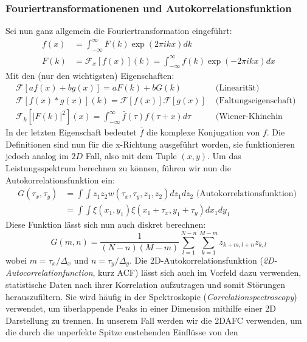 \subsubsection{Fouriertransformationenen und Autokorrelationsfunktion}
Sei nun ganz allgemein die Fouriertransformation eingeführt:
\begin{align}
f(x) &= \int_{-\infty}^{\infty} F(k)\exp(2\pi i kx)dk\\
F(k) &= \mathcal{F}_x\left [f(x)\right ](k) =
\int_{-\infty}^{\infty} f(k)\exp(-2\pi i kx)dx
\end{align}
Mit den (nur den wichtigsten) Eigenschaften:
\begin{align}
&\mathcal{F}\left [a f(x) + b g(x)\right ]
    = a F(k) + b G(k) 
    &\mbox{ (Linearität) }\\
&\mathcal{F}\left [f(x) * g(x)\right ](k)
    = \mathcal{F}\left [f(x)\right ]\mathcal{F}\left [g(x)\right ]
    \! &\mbox{ (Faltungseigenschaft) }\\
&\mathcal{F}_k\left [\left | F(k) \right |^2\right ](x)
   =  \int_{-\infty}^{\infty}\bar{f}(\tau)f(\tau + x) d\tau 
   &\mbox{ (Wiener-Khinchin Theorem) }
\end{align}
In der letzten Eigenschaft
bedeutet $\bar{f}$ die komplexe Konjugation von $f$.
Die Definitionen sind nun für die x-Richtung ausgeführt worden,
sie funktionieren jedoch analog im $2D$ Fall, also mit dem Tuple
$(x,y)$. 
Um das Leistungsspektrum berechnen zu können, führen wir 
nun die Autokorrelationsfunktion ein:
\begin{align}
    G(\tau_x,\tau_y) &=\int\int z_1 z_2 w(\tau_x,\tau_y,z_1,z_2) dz_1 dz_2 \mbox{ (Autokorrelationsfunktion) }\\
&= \int\int \xi(x_1,y_1)\xi(x_1+\tau_x,y_1+\tau_y)dx_1dy_1
\end{align}
Diese Funktion lässt sich nun auch diskret berechnen:
\begin{equation}
    G(m,n)=\frac{1}{(N-n)(M-m)}\sum_{l=1}^{N-n}\sum_{k=1}^{M-m}z_{k+m,l+n}z_{k,l}
\end{equation}
wobei $m=\tau_x/\Delta_x$ und $n=\tau_y/\Delta_y$. Die 2D-Autokorrelationsfunktion
(\textit{2D-Autocorrelationfunction}, kurz ACF) lässt sich auch im Vorfeld dazu verwenden,
statistische Daten nach ihrer Korrelation aufzutragen und somit Störungen herauszufiltern.
Sie wird häufig in der Spektroskopie (\textit{Correlationspectroscopy}) verwendet, um überlappende
Peaks in einer Dimension mithilfe einer 2D Darstellung zu trennen. In unserem Fall werden wir
die 2DAFC verwenden, um die durch die unperfekte Spitze enstehenden Einflüsse von den
